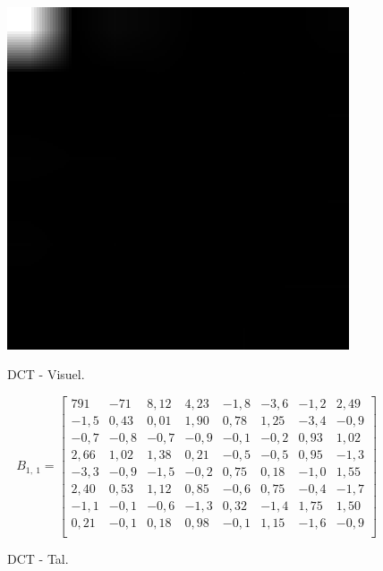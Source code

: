 \begin{figure}[!h]
\begin{minipage}[b]{0.25\linewidth}
\centering
\includegraphics[width=0.9\textwidth]{Billeder/LenaAnvendelse/RED8x8/lena2-R8x8-DCT.png}
\caption{DCT - Visuel.}
\label{fig:lena2-R8x8-DCT-visuel}
\end{minipage}
\hspace{0.5cm}
\begin{minipage}[b]{0.40\linewidth}
\centering
\[B_{1,\ 1}=\begin{bmatrix}
791    & -71  & 8,12   & 4,23   & -1,8  & -3,6  & -1,2  & 2,49   \\
-1,5  & 0,43  & 0,01   & 1,90   & 0,78  & 1,25   & -3,4  & -0,9 \\
-0,7 & -0,8 & -0,7 & -0,9 & -0,1 & -0,2 & 0,93  & 1,02   \\
2,66   & 1,02   & 1,38   & 0,21  & -0,5 & -0,5 & 0,95  & -1,3  \\
-3,3  & -0,9 & -1,5  & -0,2 & 0,75  & 0,18  & -1,0  & 1,55   \\
2,40   & 0,53  & 1,12   & 0,85  & -0,6 & 0,75  & -0,4 & -1,7  \\
-1,1  & -0,1 & -0,6 & -1,3  & 0,32  & -1,4  & 1,75   & 1,50   \\
0,21  & -0,1 & 0,18  & 0,98  & -0,1 & 1,15   & -1,6  & -0,9 \\
\end{bmatrix}\]
\caption{DCT - Tal.}
\label{fig:lena2-R8x8-DCT-matrix}
\end{minipage}
\end{figure}
